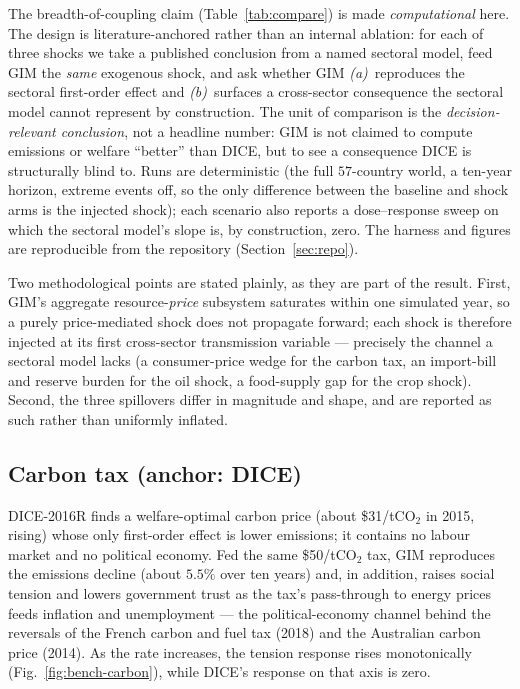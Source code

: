 \documentclass[a4paper,fleqn]{cas-sc}
\begin{document}
The breadth-of-coupling claim (Table~\ref{tab:compare}) is made \emph{computational} here. The
design is literature-anchored rather than an internal ablation: for each of three shocks we take a
published conclusion from a named sectoral model, feed GIM the \emph{same} exogenous shock, and ask
whether GIM \emph{(a)}~reproduces the sectoral first-order effect and \emph{(b)}~surfaces a
cross-sector consequence the sectoral model cannot represent by construction. The unit of comparison
is the \emph{decision-relevant conclusion}, not a headline number: GIM is not claimed to compute
emissions or welfare ``better'' than DICE, but to see a consequence DICE is structurally blind to.
Runs are deterministic (the full $57$-country world, a ten-year horizon, extreme events off, so the
only difference between the baseline and shock arms is the injected shock); each scenario also
reports a dose--response sweep on which the sectoral model's slope is, by construction, zero. The
harness and figures are reproducible from the repository (Section~\ref{sec:repo}).

Two methodological points are stated plainly, as they are part of the result. First, GIM's aggregate
resource-\emph{price} subsystem saturates within one simulated year, so a purely price-mediated shock
does not propagate forward; each shock is therefore injected at its first cross-sector transmission
variable --- precisely the channel a sectoral model lacks (a consumer-price wedge for the carbon tax,
an import-bill and reserve burden for the oil shock, a food-supply gap for the crop shock). Second,
the three spillovers differ in magnitude and shape, and are reported as such rather than uniformly
inflated.

\subsection{Carbon tax (anchor: DICE)}

DICE-2016R \citep{nordhaus2017} finds a welfare-optimal carbon price (about \$31/tCO$_2$ in 2015,
rising) whose only first-order effect is lower emissions; it contains no labour market and no
political economy. Fed the same \$50/tCO$_2$ tax, GIM reproduces the emissions decline (about $5.5\%$
over ten years) and, in addition, raises social tension and lowers government trust as the tax's
pass-through to energy prices feeds inflation and unemployment --- the political-economy channel
behind the reversals of the French carbon and fuel tax (2018) and the Australian carbon price (2014).
As the rate increases, the tension response rises monotonically (Fig.~\ref{fig:bench-carbon}), while
DICE's response on that axis is zero.
\end{document}
